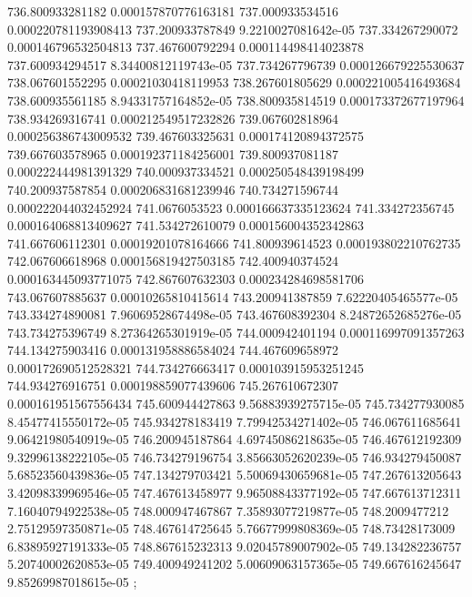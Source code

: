 {736.800933281182 0.000157870776163181
737.000933534516 0.000220781193908413
737.200933787849 9.2210027081642e-05
737.334267290072 0.000146796532504813
737.467600792294 0.000114498414023878
737.600934294517 8.34400812119743e-05
737.734267796739 0.000126679225530637
738.067601552295 0.00021030418119953
738.267601805629 0.000221005416493684
738.600935561185 8.94331757164852e-05
738.800935814519 0.000173372677197964
738.934269316741 0.000212549517232826
739.067602818964 0.000256386743009532
739.467603325631 0.000174120894372575
739.667603578965 0.000192371184256001
739.800937081187 0.000222444981391329
740.000937334521 0.000250548439198499
740.200937587854 0.000206831681239946
740.734271596744 0.000222044032452924
741.0676053523 0.000166637335123624
741.334272356745 0.000164068813409627
741.534272610079 0.000156004352342863
741.667606112301 0.00019201078164666
741.800939614523 0.000193802210762735
742.067606618968 0.000156819427503185
742.400940374524 0.000163445093771075
742.867607632303 0.000234284698581706
743.067607885637 0.00010265810415614
743.200941387859 7.62220405465577e-05
743.334274890081 7.96069528674498e-05
743.467608392304 8.24872652685276e-05
743.734275396749 8.27364265301919e-05
744.000942401194 0.000116997091357263
744.134275903416 0.000131958886584024
744.467609658972 0.000172690512528321
744.734276663417 0.000103915953251245
744.934276916751 0.000198859077439606
745.267610672307 0.000161951567556434
745.600944427863 9.56883939275715e-05
745.734277930085 8.45477415550172e-05
745.934278183419 7.79942534271402e-05
746.067611685641 9.06421980540919e-05
746.200945187864 4.69745086218635e-05
746.467612192309 9.32996138222105e-05
746.734279196754 3.85663052620239e-05
746.934279450087 5.68523560439836e-05
747.134279703421 5.50069430659681e-05
747.267613205643 3.42098339969546e-05
747.467613458977 9.96508843377192e-05
747.667613712311 7.16040794922538e-05
748.000947467867 7.35893077219877e-05
748.2009477212 2.75129597350871e-05
748.467614725645 5.76677999808369e-05
748.73428173009 6.83895927191333e-05
748.867615232313 9.02045789007902e-05
749.134282236757 5.20740002620853e-05
749.400949241202 5.00609063157365e-05
749.667616245647 9.85269987018615e-05
};